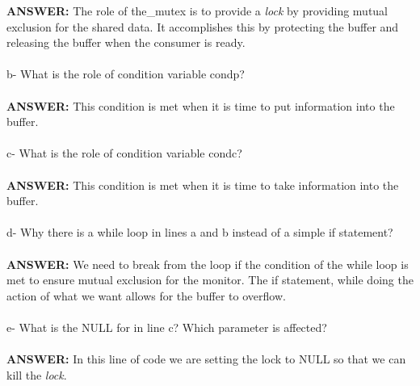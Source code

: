 \documentclass[12pt]{article}
\begin{document}
\textbf{ANSWER: }The role of the\_mutex is to provide a \textit{lock} by providing mutual 
exclusion for the shared data. It accomplishes this by protecting the buffer and releasing 
the buffer when the consumer is ready.\\\\
b- What is the role of condition variable condp?\\\\
\textbf{ANSWER: }This condition is met when it is time to put information into the buffer.\\\\
c- What is the role of condition variable condc?\\\\
\textbf{ANSWER: }This condition is met when it is time to take information into the buffer.\\\\
d- Why there is a while loop in lines a and b instead of a simple if
statement?\\\\
\textbf{ANSWER: } We need to break from the loop if the condition of the while loop 
is met to ensure mutual exclusion for the monitor. The if statement, while doing 
the action of what we want allows for the buffer to overflow.\\\\
e- What is the NULL for in line c? Which parameter is affected?\\\\
\textbf{ANSWER: }In this line of code we are setting the lock to NULL so that we 
can kill the \textit{lock}.\\\\
\end{document}

